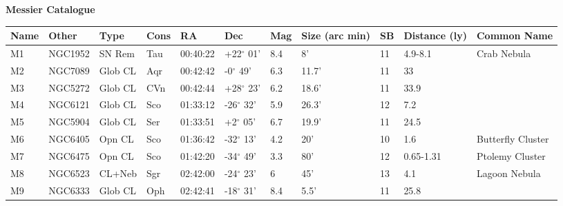 \newpage

\small
\noindent

{\bf Messier Catalogue}
\begin{longtable}{@{}lllllllllll@{}}
\hline
{\bf Name} & {\bf Other} & {\bf Type} & {\bf Cons} & {\bf RA}  & {\bf Dec} & {\bf Mag} & {\bf Size (arc min)} & {\bf SB} & {\bf Distance (ly)} & {\bf Common Name}               \\
\hline
M1         & NGC1952     & SN Rem     & Tau       & 00:40:22 & +22$^{\circ}$ 01'  & 8.4       & 8'                   & 11       & 4.9-8.1             & Crab Nebula                               \\
M2         & NGC7089     & Glob CL    & Aqr       & 00:42:42 & -0$^{\circ}$ 49'   & 6.3       & 11.7'                & 11       & 33                  &                                           \\
M3         & NGC5272     & Glob CL    & CVn       & 00:42:44 & +28$^{\circ}$ 23'  & 6.2       & 18.6'                & 11       & 33.9                &                                           \\
M4         & NGC6121     & Glob CL    & Sco       & 01:33:12 & -26$^{\circ}$ 32'  & 5.9       & 26.3'                & 12       & 7.2                 &                                           \\
M5         & NGC5904     & Glob CL    & Ser       & 01:33:51 & +2$^{\circ}$ 05'   & 6.7       & 19.9'                & 11       & 24.5                &                                           \\
M6         & NGC6405     & Opn CL     & Sco       & 01:36:42 & -32$^{\circ}$ 13'  & 4.2       & 20'                  & 10       & 1.6                 & Butterfly Cluster                         \\
M7         & NGC6475     & Opn CL     & Sco       & 01:42:20 & -34$^{\circ}$ 49'  & 3.3       & 80'                  & 12       & 0.65-1.31           & Ptolemy Cluster                           \\
M8         & NGC6523     & CL+Neb     & Sgr       & 02:42:00 & -24$^{\circ}$ 23'  & 6         & 45'                  & 13       & 4.1                 & Lagoon Nebula                             \\
M9         & NGC6333     & Glob CL    & Oph       & 02:42:41 & -18$^{\circ}$ 31'  & 8.4       & 5.5'                 & 11       & 25.8                &                                           \\

\end{longtable}
